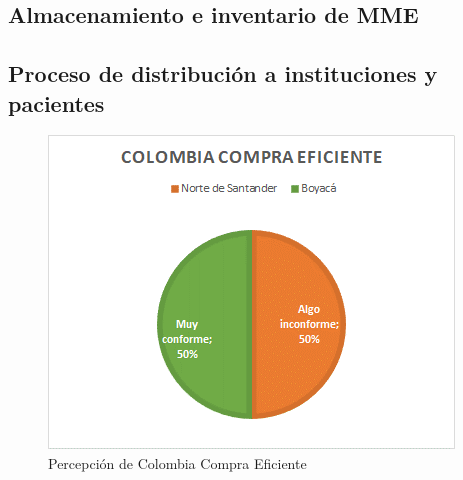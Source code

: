 \documentclass[
]{book}
\begin{document}
\hypertarget{almacenamiento-e-inventario-de-mme}{%
\subsection{Almacenamiento e inventario de MME}\label{almacenamiento-e-inventario-de-mme}}

\hypertarget{proceso-de-distribuciuxf3n-a-instituciones-y-pacientes}{%
\subsection{Proceso de distribución a instituciones y pacientes}\label{proceso-de-distribuciuxf3n-a-instituciones-y-pacientes}}

\begin{figure}
\includegraphics[width=0.85\linewidth]{figures/Imagen7} \caption{Percepción de Colombia Compra Eficiente}\label{fig:ColombiaCompraEficienteRecRegAndinaNorte}
\end{figure}

\begingroup\fontsize{8}{10}\selectfont
\end{document}
